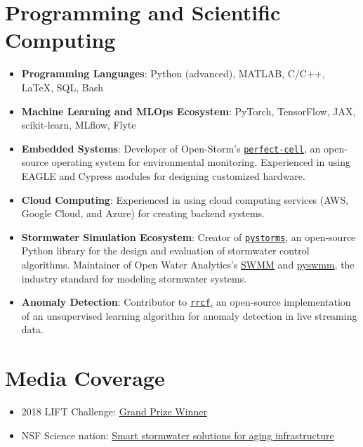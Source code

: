 \documentclass[a4paper,11pt]{article}
\begin{document}
\section*{Programming and Scientific Computing}

\begin{itemize}
\item \textbf{Programming Languages}: Python (advanced), MATLAB, C/C++, \LaTeX, SQL, Bash
\item \textbf{Machine Learning and MLOps Ecosystem}: PyTorch, TensorFlow, JAX, scikit-learn, MLflow, Flyte
\item \textbf{Embedded Systems}: Developer of Open-Storm's \href{https://github.com/open-storm/perfect-cell}{\texttt{perfect-cell}}, an open-source operating system for environmental monitoring. Experienced in using EAGLE and Cypress modules for designing customized hardware.
\item \textbf{Cloud Computing}: Experienced in using cloud computing services (AWS, Google Cloud, and Azure) for creating backend systems.
\item \textbf{Stormwater Simulation Ecosystem}: Creator of \href{https://klabum.github.io/pystorms/}{\texttt{pystorms}}, an open-source Python library for the design and evaluation of stormwater control algorithms. Maintainer of Open Water Analytics's \href{https://github.com/OpenWaterAnalytics/Stormwater-Management-Model}{SWMM} and \href{https://github.com/OpenWaterAnalytics/pyswmm}{pyswmm}, the industry standard for modeling stormwater systems.
\item \textbf{Anomaly Detection}: Contributor to \href{https://github.com/kLabUM/rrcf}{\texttt{rrcf}}, an open-source implementation of an unsupervised learning algorithm for anomaly detection in live streaming data.
\end{itemize}

\section*{Media Coverage}

\begin{itemize}
	\item 2018 LIFT Challenge: \href{https://cee.engin.umich.edu/stories/joint-u-m-and-glwa-team-wins-inaugural-intelligent-water-challenge/}{Grand Prize Winner}
	\item NSF Science nation: \href{https://www.youtube.com/watch?v=mStPThxAU08}{Smart stormwater solutions for aging infrastructure}
\end{itemize}
\end{document}
